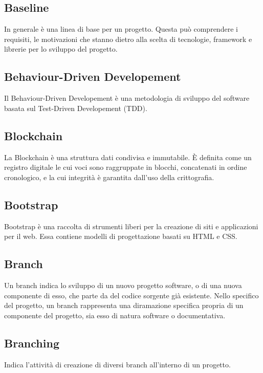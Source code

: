 
\subsection*{Baseline}
In generale è una linea di base per un progetto. Questa può comprendere i requisiti, le motivazioni che stanno dietro alla scelta di tecnologie, framework e librerie per lo sviluppo del progetto.

\subsection*{Behaviour-Driven Developement}
Il Behaviour-Driven Developement è una metodologia di sviluppo del software basata sul Test-Driven Developement (TDD).

\subsection*{Blockchain}
La Blockchain è una struttura dati condivisa e immutabile. È definita come un registro digitale le cui voci sono raggruppate in blocchi, concatenati in ordine cronologico, e la cui integrità è garantita dall'uso della crittografia.

\subsection*{Bootstrap}
Bootstrap è una raccolta di strumenti liberi per la creazione di siti e applicazioni per il web. Essa contiene modelli di progettazione basati su HTML e CSS.

\subsection*{Branch}
Un branch indica lo sviluppo di un nuovo progetto software, o di una nuova componente di esso, che parte da del codice sorgente già esistente. Nello specifico del progetto, un branch rappresenta una diramazione specifica propria di un componente del progetto, sia esso di natura software o documentativa.

\subsection*{Branching}
Indica l'attività di creazione di diversi branch all'interno di un progetto.

